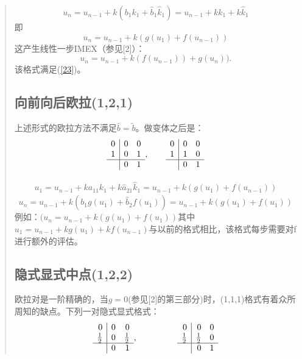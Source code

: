 \documentclass{article}
\begin{document}
\begin{CJK}{UTF8}{gkai}
\begin{quotation}
\begin{equation*}
u_{n}=u_{n-1}+k(b_{1}k_{1}+\hat{b}_{1}\hat{k}_{1})=u_{n-1}+kk_{1}+k\hat{k}_{1}
\end{equation*}
即
\begin{equation*}
u_{n}=u_{n-1}+k(g(u_{1})+f(u_{n-1}))
\end{equation*}
这产生线性一步IMEX（参见[2]）：
\begin{equation}
u_{n}=u_{n-1}+k(f(u_{n-1}))+g(u_{n})).
\end{equation}
该格式满足(\ref{23})。

\subsection{向前向后欧拉(1,2,1)}

上述形式的欧拉方法不满足$\widehat{b}=\tilde{b}$。做变体之后是：
\[
\begin{array}{r|rr}
0 & 0 & 0\\
1 & 0 & 1 \\
\hline
& 0 & 1
\end{array},~~~~~~
\begin{array}{r|rr}
0 & 0 & 0\\
1 & 1 & 0 \\
\hline
& 0 & 1
\end{array}
\]

\begin{gather}
u_{1}=u_{n-1}+ka_{11}k_{1}+k\hat{a}_{21}\hat{k}_{1}=u_{n-1}+k(g(u_{1})+f(u_{n-1}))
\end{gather}
\begin{equation*}
u_{n}=u_{n-1}+k(b_{1}g(u_{1})+\hat{b}_{2}f(u_{1}))=u_{n-1}+k(g(u_{1})+f(u_{1}))
\end{equation*}
例如：$(u_{n}=u_{n-1}+k(g(u_{1})+f(u_{1}))$其中$u_{1}=u_{n-1}+kg(u_{1})+kf(u_{n-1})$与以前的格式相比，该格式每步需要对f进行额外的评估。

\subsection{隐式显式中点(1,2,2)}
欧拉对是一阶精确的，当$g=0$(参见[2]的第三部分)时，(1,1,1)格式有着众所周知的缺点。下列一对隐式显式格式：
\[
\begin{array}{r|rr}
0 & 0 & 0\\
\frac{1}{2} & 0 & \frac{1}{2}\\
\hline
& 0 & 1
\end{array},~~~~~~~~~~~~~~
\begin{array}{r|rr}
0 & 0 & 0\\
\frac{1}{2} & \frac{1}{2} & 0\\
\hline
& 0 & 1
\end{array}
\]


\end{quotation}
\end{CJK}
\end{document}
